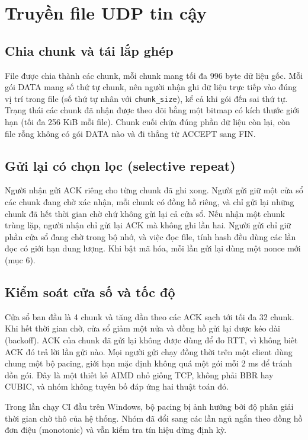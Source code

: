 \section{Truyền file UDP tin cậy}
\subsection{Chia chunk và tái lắp ghép}
File được chia thành các chunk, mỗi chunk mang tối đa 996 byte dữ liệu gốc. Mỗi gói DATA mang số thứ tự chunk, nên người nhận ghi dữ liệu trực tiếp vào đúng vị trí trong file (số thứ tự nhân với \texttt{chunk\_size}), kể cả khi gói đến sai thứ tự. Trạng thái các chunk đã nhận được theo dõi bằng một bitmap có kích thước giới hạn (tối đa 256 KiB mỗi file). Chunk cuối chứa đúng phần dữ liệu còn lại, còn file rỗng không có gói DATA nào và đi thẳng từ ACCEPT sang FIN.

\subsection{Gửi lại có chọn lọc (selective repeat)}
Người nhận gửi ACK riêng cho từng chunk đã ghi xong. Người gửi giữ một cửa sổ các chunk đang chờ xác nhận, mỗi chunk có đồng hồ riêng, và chỉ gửi lại những chunk đã hết thời gian chờ chứ không gửi lại cả cửa sổ. Nếu nhận một chunk trùng lặp, người nhận chỉ gửi lại ACK mà không ghi lần hai. Người gửi chỉ giữ phần cửa sổ đang chờ trong bộ nhớ, và việc đọc file, tính hash đều dùng các lần đọc có giới hạn dung lượng. Khi bật mã hóa, mỗi lần gửi lại dùng một nonce mới (mục 6).

\subsection{Kiểm soát cửa số và tốc độ}
Cửa sổ ban đầu là 4 chunk và tăng dần theo các ACK sạch tới tối đa 32 chunk. Khi hết thời gian chờ, cửa sổ giảm một nửa và đồng hồ gửi lại được kéo dài (backoff). ACK của chunk đã gửi lại không được dùng để đo RTT, vì không biết ACK đó trả lời lần gửi nào. Mọi người gửi chạy đồng thời trên một client dùng chung một bộ pacing, giới hạn mặc định không quá một gói mỗi 2 ms để tránh dồn gói. Đây là một thiết kế AIMD nhỏ giống TCP, không phải BBR hay CUBIC, và nhóm không tuyên bố đáp ứng hai thuật toán đó.

Trong lần chạy CI đầu trên Windows, bộ pacing bị ảnh hưởng bởi độ phân giải thời gian chờ thô của hệ thống. Nhóm đã đổi sang các lần ngủ ngắn theo đồng hồ đơn điệu (monotonic) và vẫn kiểm tra tín hiệu dừng định kỳ.

